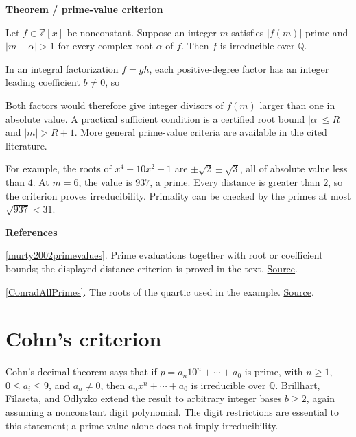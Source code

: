 \documentclass[11pt,a4paper,oneside,openany]{book}
\newcommand{\atlasdisplay}[1]{\par\begingroup\centering\vspace{3pt}\noindent\adjustbox{max width=\linewidth}{\(\displaystyle #1\)}\par\vspace{5pt}\endgroup}
\newenvironment{sources}{\par\smallskip\begingroup\footnotesize\color{atlasgray}\leftskip=10pt\setlength{\parskip}{2pt}}{\par\endgroup\smallskip}
\begin{document}
\begin{atlasblock}[standard]
\textbf{\sffamily Theorem  /  prime-value criterion}\par\smallskip
\color{black} Let \(f\in\mathbb Z[x]\) be nonconstant. Suppose an integer \(m\) satisfies \(|f(m)|\) prime and \(|m-\alpha|>1\) for every complex root \(\alpha\) of \(f\). Then \(f\) is irreducible over \(\mathbb Q\).\par
\end{atlasblock}\color{black}

\color{black} In an integral factorization \(f=gh\), each positive-degree factor has an integer leading coefficient \(b\ne0\), so\par

\atlasdisplay{|g(m)|=|b|\prod_{g(\alpha)=0}|m-\alpha|>1.}

\color{black} Both factors would therefore give integer divisors of \(f(m)\) larger than one in absolute value. A practical sufficient condition is a certified root bound \(|\alpha|\le R\) and \(|m|>R+1\). More general prime-value criteria are available in the cited literature.\par

\color{black} For example, the roots of \(x^4-10x^2+1\) are \(\pm\sqrt2\pm\sqrt3\), all of absolute value less than \(4\). At \(m=6\), the value is \(937\), a prime. Every distance is greater than \(2\), so the criterion proves irreducibility. Primality can be checked by the primes at most \(\sqrt{937}<31\).\par
\begin{sources}
\textbf{References}\par\smallskip
\noindent\hyperlink{ref:murty2002primevalues}{[murty2002primevalues]}. Prime evaluations together with root or coefficient bounds; the displayed distance criterion is proved in the text. \href{https://doi.org/10.1080/00029890.2002.11919872}{Source}.\par
\noindent\hyperlink{ref:ConradAllPrimes}{[ConradAllPrimes]}. The roots of the quartic used in the example. \href{https://kconrad.math.uconn.edu/blurbs/ringtheory/reducibleallp.pdf}{Source}.\par
\end{sources}\color{black}
\section{Cohn's criterion}
\color{black} Cohn's decimal theorem says that if \(p=a_n10^n+\cdots+a_0\) is prime, with \(n\ge1\), \(0\le a_i\le9\), and \(a_n\ne0\), then \(a_nx^n+\cdots+a_0\) is irreducible over \(\mathbb Q\). Brillhart, Filaseta, and Odlyzko extend the result to arbitrary integer bases \(b\ge2\), again assuming a nonconstant digit polynomial. The digit restrictions are essential to this statement; a prime value alone does not imply irreducibility.\par
\end{document}

